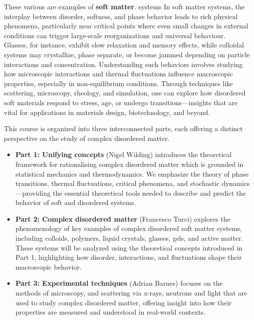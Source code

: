 \documentclass[
  letterpaper,
  DIV=11,
  numbers=noendperiod]{scrreprt}
\providecommand{\tightlist}{%
  \setlength{\itemsep}{0pt}\setlength{\parskip}{0pt}}
\begin{document}
These various are examples of \textbf{soft matter}. systems In soft
matter systems, the interplay between disorder, softness, and phase
behavior leads to rich physical phenomena, particularly near critical
points where even small changes in external conditions can trigger
large-scale reorganizations and universal behaviour. Glasses, for
instance, exhibit slow relaxation and memory effects, while colloidal
systems may crystallize, phase separate, or become jammed depending on
particle interactions and concentration. Understanding such behaviors
involves studying how microscopic interactions and thermal fluctuations
influence macroscopic properties, especially in non-equilibrium
conditions. Through techniques like scattering, microscopy, rheology,
and simulation, one can explore how disordered soft materials respond to
stress, age, or undergo transitions---insights that are vital for
applications in materials design, biotechnology, and beyond.

This course is organized into three interconnected parts, each offering
a distinct perspective on the study of complex disordered matter.

\begin{itemize}
\tightlist
\item
  \textbf{Part 1: Unifying concepts} (Nigel Wilding) introduces the
  theoretical framework for rationalising complex disordered matter
  which is grounded in statistical mechanics and thermodynamics. We
  emphasize the theory of phase transitions, thermal fluctuations,
  critical phenomena, and stochastic dynamics---providing the essential
  theoretical tools needed to describe and predict the behavior of soft
  and disordered systems.\\
\item
  \textbf{Part 2: Complex disordered matter} (Francesco Turci) explores
  the phenomenology of key examples of complex disordered soft matter
  systems, including colloids, polymers, liquid crystals, glasses, gels,
  and active matter. These systems will be analyzed using the
  theoretical concepts introduced in Part 1, highlighting how disorder,
  interactions, and fluctuations shape their macroscopic behavior.\\
\item
  \textbf{Part 3: Experimental techniques} (Adrian Barnes) focuses on
  the methods of microscopy, and scattering via x-rays, neutrons and
  light that are used to study complex disordered matter, offering
  insight into how their properties are measured and understood in
  real-world contexts.
\end{itemize}
\end{document}
